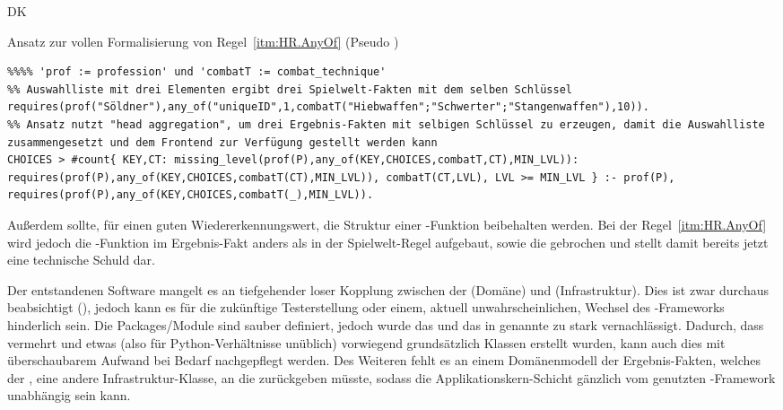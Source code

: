\begin{enumerateWithCode}{DK}
    \begin{listing}[!h]
        \caption{Ansatz zur vollen Formalisierung von Regel~\ref{itm:HR.AnyOf} (Pseudo )}\label{lst:formalisierungsansatz-count-by}
        \begin{verbatim}
%%%% 'prof := profession' und 'combatT := combat_technique'
%% Auswahlliste mit drei Elementen ergibt drei Spielwelt-Fakten mit dem selben Schlüssel
requires(prof("Söldner"),any_of("uniqueID",1,combatT("Hiebwaffen";"Schwerter";"Stangenwaffen"),10)).
%% Ansatz nutzt "head aggregation", um drei Ergebnis-Fakten mit selbigen Schlüssel zu erzeugen, damit die Auswahlliste zusammengesetzt und dem Frontend zur Verfügung gestellt werden kann
CHOICES > #count{ KEY,CT: missing_level(prof(P),any_of(KEY,CHOICES,combatT,CT),MIN_LVL)): requires(prof(P),any_of(KEY,CHOICES,combatT(CT),MIN_LVL)), combatT(CT,LVL), LVL >= MIN_LVL } :- prof(P), requires(prof(P),any_of(KEY,CHOICES,combatT(_),MIN_LVL)).
        \end{verbatim}
    \end{listing}

    \item Außerdem sollte, für einen guten Wiedererkennungswert, die Struktur einer -Funktion beibehalten werden.
    Bei der Regel~\ref{itm:HR.AnyOf} wird jedoch die -Funktion  im Ergebnis-Fakt anders als in der Spielwelt-Regel aufgebaut, sowie die  gebrochen und stellt damit bereits jetzt eine technische Schuld dar.

    \item Der entstandenen Software mangelt es an tiefgehender loser Kopplung zwischen der  (Domäne) und  (Infrastruktur).
    Dies ist zwar durchaus beabsichtigt (\vgl {}), jedoch kann es für die zukünftige Testerstellung oder einem, aktuell unwahrscheinlichen, Wechsel des -Frameworks hinderlich sein.
    Die Packages/Module sind sauber definiert, jedoch wurde das  und \insb das in  genannte  zu stark vernachlässigt.
    Dadurch, dass vermehrt und etwas  (also für Python-Verhältnisse unüblich) vorwiegend \bzw grundsätzlich Klassen erstellt wurden, kann auch dies mit überschaubarem Aufwand bei Bedarf nachgepflegt werden.
    Des Weiteren fehlt es an einem Domänenmodell der Ergebnis-Fakten, welches der , \bzw eine andere Infrastruktur-Klasse, an die  zurückgeben müsste, sodass die Applikationskern-Schicht gänzlich vom genutzten -Framework unabhängig sein kann.


\end{enumerateWithCode}
